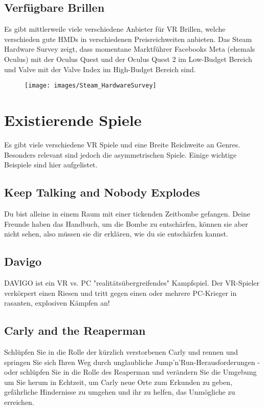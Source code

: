 \subsection{Verfügbare Brillen}
Es gibt mittlerweile viele verschiedene Anbieter für VR Brillen, welche verschieden gute HMDs in verschiedenen Preisreichweiten anbieten.
Das Steam Hardware Survey zeigt, dass momentane Marktführer Facebooks Meta (ehemals Oculus) mit der Oculus Quest und der Oculus Quest 2 im Low-Budget Bereich und Valve mit der Valve Index im High-Budget Bereich sind.

\begin{figure}[h]
	\centering
	\texttt{[image: images/Steam\_HardwareSurvey]}
	\caption{\cite{_steam_hardware}}
\end{figure}

\section{Existierende Spiele}
Es gibt viele verschiedene VR Spiele und eine Breite Reichweite an Genres. Besonders relevant sind jedoch die asymmetrischen Spiele. Einige wichtige Beispiele sind hier aufgelistet.

\subsection{Keep Talking and Nobody Explodes}
Du bist alleine in einem Raum mit einer tickenden Zeitbombe gefangen. Deine Freunde haben das Handbuch, um die Bombe zu entschärfen, können sie aber nicht sehen, also müssen sie dir erklären, wie du sie entschärfen kannst.

\subsection{Davigo}
DAVIGO ist ein VR vs. PC "realitätsübergreifendes" Kampfspiel. Der VR-Spieler verkörpert einen Riesen und tritt gegen einen oder mehrere PC-Krieger in rasanten, explosiven Kämpfen an!

\subsection{Carly and the Reaperman}
Schlüpfen Sie in die Rolle der kürzlich verstorbenen Carly und rennen und springen Sie sich Ihren Weg durch unglaubliche Jump'n'Run-Herausforderungen - oder schlüpfen Sie in die Rolle des Reaperman und verändern Sie die Umgebung um Sie herum in Echtzeit, um Carly neue Orte zum Erkunden zu geben, gefährliche Hindernisse zu umgehen und ihr zu helfen, das Unmögliche zu erreichen.


